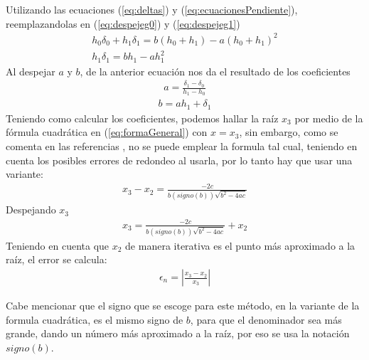 \documentclass[ceqn,10pt]{SelfArx}
\begin{document}
Utilizando las ecuaciones (\ref*{eq:deltas}) y (\ref*{eq:ecuacionesPendiente}), reemplazandolas en (\ref*{eq:despejeg0}) y (\ref*{eq:despejeg1})
\begin{equation} \label{eq:reemp}
	\begin{aligned}
	 h_{0}\delta_{0}+h_{1}\delta_{1} = b(h_{0}+h_{1})-a(h_{0}+h_{1})^2\\
	 h_{1}\delta_{1} = b h_{1} - ah_{1}^2 
\end{aligned}
\end{equation}
Al despejar $a$ y $b$, de la anterior ecuación nos da el resultado de los coeficientes
\begin{equation} \label{eq:coeficienteA}
	\begin{aligned}
	a = \frac{\delta_{1}-\delta_{0}}{h_{1}-h_{0}}
\end{aligned}
\end{equation}
\begin{equation} \label{eq:coeficienteB}
	\begin{aligned}
	b = a h_{1} + \delta_{1}
\end{aligned}
\end{equation}
Teniendo como calcular los coeficientes, podemos hallar la raíz $x_{3}$ por medio de la fórmula cuadrática en (\ref*{eq:formaGeneral}) con $x = x_{3}$, sin embargo, como se comenta en las referencias \cite{burden2017, chapra2011}, no se puede emplear la formula tal cual, teniendo en cuenta los posibles errores de redondeo al usarla, por lo tanto hay que usar una variante:
\begin{equation} \label{eq:x3}
	\begin{aligned}
	x_{3}-x_{2}=\frac{-2c}{b (signo(b))\sqrt{b^2-4ac}}
\end{aligned}
\end{equation}
Despejando $x_{3}$
\begin{equation} \label{eq:x3Solv2}
	\begin{aligned}
	x_{3}=\frac{-2c}{b(signo(b))\sqrt{b^2-4ac}}+x_{2}
\end{aligned}
\end{equation}
Teniendo en cuenta que $x_{2}$ de manera iterativa es el punto más aproximado a la raíz, el error se calcula:
\begin{equation} \label{eq:error}
	\begin{aligned}
	\epsilon_{n}= |\frac{x_{3}-x_{2}}{x_{3}}|
\end{aligned}
\end{equation}

Cabe mencionar que el signo que se escoge para este método, en la variante de la formula cuadrática, es el mismo signo de $b$, para que el denominador sea más grande, dando un número más aproximado a la raíz, por eso se usa la notación $signo(b)$.
\end{document}
